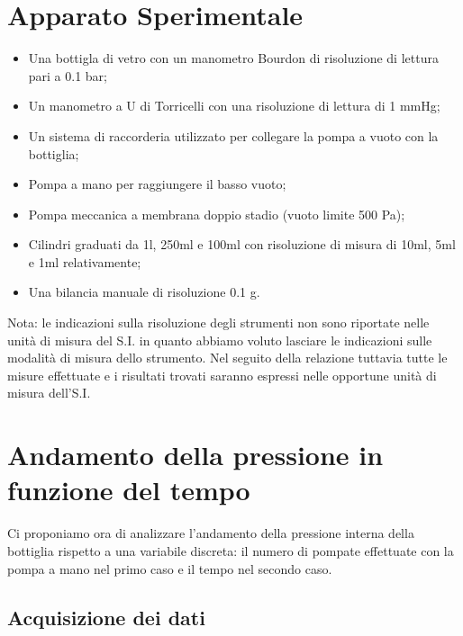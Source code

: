 \section{Apparato Sperimentale}%

\begin{itemize}
	\item{Una bottigla di vetro con un manometro Bourdon di risoluzione di lettura pari a 0.1 bar;}
	\item{Un manometro a U di Torricelli con una risoluzione di lettura di 1 mmHg;}
	\item{Un sistema di raccorderia utilizzato per collegare la pompa a vuoto con la bottiglia;}
	\item{Pompa a mano per raggiungere il basso vuoto;}
	\item{Pompa meccanica a membrana doppio stadio (vuoto limite 500 Pa);}
	\item{Cilindri graduati da 1\si{\l}, 250\si{\ml} e 100\si{\ml} con risoluzione di misura di 10\si{\ml}, 5\si{\ml} e 1\si{\ml} relativamente;}
	\item{Una bilancia manuale di risoluzione 0.1 g.}
\end{itemize}
%
Nota:
le indicazioni sulla risoluzione degli strumenti non sono riportate nelle unità di misura del S.I. in quanto abbiamo voluto lasciare le indicazioni sulle modalità di misura dello strumento. Nel seguito della relazione tuttavia tutte le misure effettuate e i risultati trovati saranno espressi nelle opportune unità di misura dell'S.I.

\section{Andamento della pressione in funzione del tempo}

Ci proponiamo ora di analizzare l'andamento della pressione interna della bottiglia rispetto a una variabile discreta: il numero di pompate effettuate con la pompa a mano nel primo caso e il tempo nel secondo caso.

\subsection{Acquisizione dei dati}

